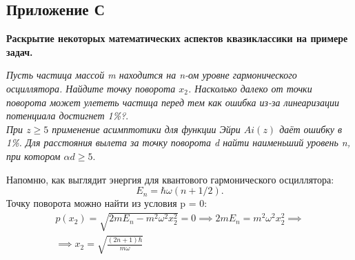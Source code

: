 \setcounter{figure}{0} 
\begin{center}
    \section{Приложение С}\label{appendix:C}
    \textbf{\Large{Раскрытие некоторых математических аспектов квазиклассики на примере задач.}}
\end{center}

\begin{center}
\textit{Пусть частица массой m находится на n-ом уровне гармонического осциллятора. Найдите точку поворота $x_2$. Насколько далеко от точки поворота может улететь частица перед тем как ошибка из-за линеаризации потенциала достигнет 1\%?}.\\
\textit{При $z\geq 5$ применение асимптотики для функции Эйри $Ai(z)$ даёт ошибку в 1\%. Для расстояния вылета за точку поворота d найти наименьший уровень n, при котором $\alpha d\geq 5$}.
\end{center}

Напомню, как выглядит энергия для квантового гармонического осциллятора: 
\[E_n = \hbar\omega(n + 1/2).\] Точку поворота можно найти из условия p = 0:
\begin{gather*} 
p(x_2) = \sqrt{2mE_n - m^2\omega^2x_2^2} = 0 \implies 2mE_n = m^2\omega^2x_2^2 \implies \\
\implies x_2 = \sqrt{\frac{(2n + 1)\hbar}{m\omega}}
\end{gather*}

